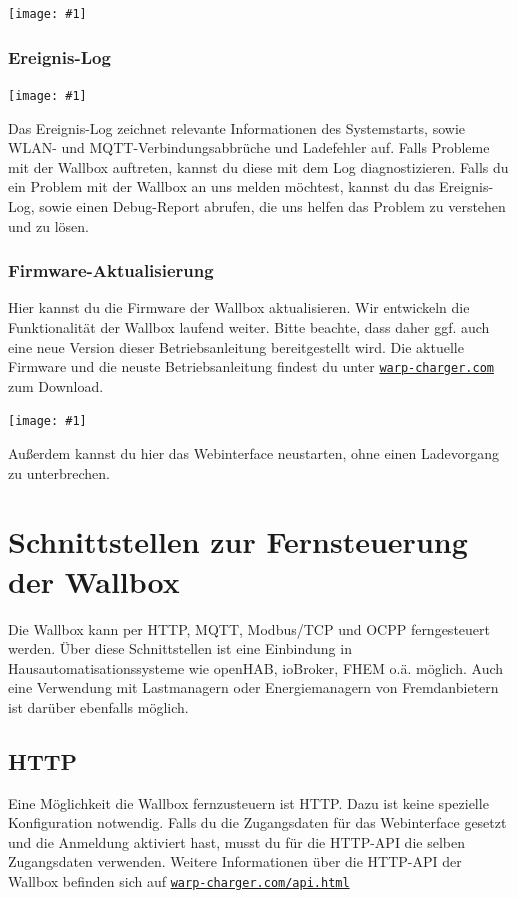 \documentclass[a4paper,10pt]{article}
\newcommand{\gfx}[1]{\texttt{[image: \#1]}}
\newcommand\rurl[2]{%
  \href{#1}{\nolinkurl{#2}}%
}
\begin{document}
\begin{multicols*}{2}
	\gfx{./img_warp2/resized/web_ntp}

	\subsubsection{Ereignis-Log}
	\gfx{./img_warp2/resized/web_event_log}

	Das Ereignis-Log zeichnet relevante Informationen des Systemstarts, sowie WLAN- und MQTT-Verbindungsabbrüche und Ladefehler auf.
	Falls Probleme mit der Wallbox auftreten, kannst du diese mit dem Log diagnostizieren.
	Falls du ein Problem mit der Wallbox an uns melden möchtest, kannst du das Ereignis-Log,
	sowie einen Debug-Report abrufen, die uns helfen das Problem zu verstehen und zu lösen.

	\subsubsection{Firmware-Aktualisierung}\label{firmware-update}
	Hier kannst du die Firmware der Wallbox aktualisieren. Wir entwickeln die Funktionalität
	der Wallbox laufend weiter. Bitte beachte, dass daher ggf. auch eine neue
	Version dieser Betriebsanleitung bereitgestellt wird.
	Die aktuelle Firmware und die neuste Betriebsanleitung findest du unter
	\rurl{https://warp-charger.com}{warp-charger.com} zum Download.

	\gfx{./img_warp2/resized/web_firmware_update}

	Außerdem kannst du hier das Webinterface neustarten, ohne einen Ladevorgang zu unterbrechen.

	\newpage

	\section{Schnittstellen zur Fernsteuerung der Wallbox}\label{interfaces}
	Die Wallbox kann per HTTP, MQTT, Modbus/TCP und OCPP ferngesteuert werden. Über diese Schnittstellen ist eine
	Einbindung in Hausautomatisationssysteme wie openHAB, ioBroker, FHEM o.ä.
	möglich. Auch eine Verwendung mit Lastmanagern oder Energiemanagern von Fremdanbietern
	ist darüber ebenfalls möglich.

	\subsection{HTTP}\label{http-interface}
	Eine Möglichkeit die Wallbox fernzusteuern ist HTTP. Dazu ist keine
	spezielle Konfiguration notwendig. Falls du die Zugangsdaten für das Webinterface gesetzt und die Anmeldung aktiviert hast, musst du
	für die HTTP-API die selben Zugangsdaten verwenden.
	Weitere Informationen über die HTTP-API der Wallbox befinden sich auf \rurl{https://warp-charger.com/api.html}{warp-charger.com/api.html}



\end{multicols*}
\end{document}
